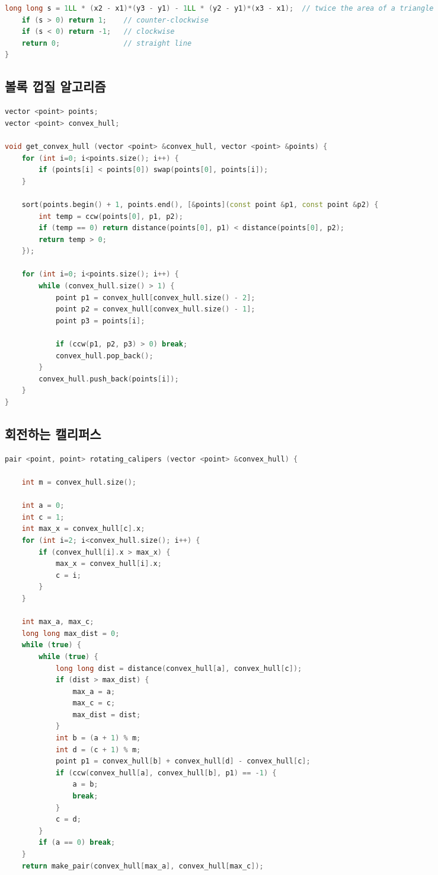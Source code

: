 \documentclass[]{article}
\begin{document}
\begin{multicols*}{2}
\begin{lstlisting}[language=c++]
    long long s = 1LL * (x2 - x1)*(y3 - y1) - 1LL * (y2 - y1)*(x3 - x1);  // twice the area of a triangle
    if (s > 0) return 1;    // counter-clockwise
    if (s < 0) return -1;   // clockwise
    return 0;               // straight line
}
\end{lstlisting}
\subsection{볼록 껍질 알고리즘}
\begin{lstlisting}[language=c++]
vector <point> points;
vector <point> convex_hull;

void get_convex_hull (vector <point> &convex_hull, vector <point> &points) {
    for (int i=0; i<points.size(); i++) {
        if (points[i] < points[0]) swap(points[0], points[i]);
    }

    sort(points.begin() + 1, points.end(), [&points](const point &p1, const point &p2) {
        int temp = ccw(points[0], p1, p2);
        if (temp == 0) return distance(points[0], p1) < distance(points[0], p2);
        return temp > 0;
    });

    for (int i=0; i<points.size(); i++) {
        while (convex_hull.size() > 1) {
            point p1 = convex_hull[convex_hull.size() - 2];
            point p2 = convex_hull[convex_hull.size() - 1];
            point p3 = points[i];

            if (ccw(p1, p2, p3) > 0) break;
            convex_hull.pop_back();
        }
        convex_hull.push_back(points[i]);
    }
}
\end{lstlisting}
\clearpage
\subsection{회전하는 캘리퍼스}
\begin{lstlisting}[language=c++]
pair <point, point> rotating_calipers (vector <point> &convex_hull) {

    int m = convex_hull.size();

    int a = 0;
    int c = 1;
    int max_x = convex_hull[c].x;
    for (int i=2; i<convex_hull.size(); i++) {
        if (convex_hull[i].x > max_x) {
            max_x = convex_hull[i].x;
            c = i;
        }
    }

    int max_a, max_c;
    long long max_dist = 0;
    while (true) {
        while (true) {
            long long dist = distance(convex_hull[a], convex_hull[c]);
            if (dist > max_dist) {
                max_a = a;
                max_c = c;
                max_dist = dist;
            }
            int b = (a + 1) % m;
            int d = (c + 1) % m;
            point p1 = convex_hull[b] + convex_hull[d] - convex_hull[c];
            if (ccw(convex_hull[a], convex_hull[b], p1) == -1) {
                a = b;
                break;
            }
            c = d;
        }
        if (a == 0) break;
    }
    return make_pair(convex_hull[max_a], convex_hull[max_c]);


\end{lstlisting}
\end{multicols*}
\end{document}
